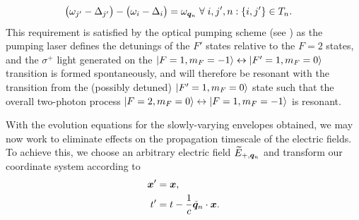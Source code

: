 \begin{align}
    \big(\omega_{j'} - \Delta_{j'}\big) - \big(\omega_i - \Delta_i\big) &= \omega_{\bm{q}_n} \;\forall \; i, j', n : \left\{i, j'\right\} \in T_n.
\end{align}
This requirement is satisfied by the optical pumping scheme (see ) as the pumping laser defines the detunings of the $F'$ states relative to the $F=2$ states, and the $\sigma^+$ light generated on the ${\left|F=1, m_F=-1\right>} \leftrightarrow {\ensuremath{\left|F'=1, m_F=0\right>}}$ transition is formed spontaneously, and will therefore be resonant with the transition from the (possibly detuned) ${\left|F'=1, m_F=0\right>}$ state such that the overall two-photon process ${\left|F=2, m_F=0\right>} \leftrightarrow {\ensuremath{\left|F=1, m_F=-1\right>}}$ is resonant.

With the evolution equations for the slowly-varying envelopes obtained, we may now work to eliminate effects on the propagation timescale of the electric fields.  To achieve this, we choose an arbitrary electric field $\widetilde{E}_{+, \bm{q}_n}$  and transform our coordinate system according to
\begin{align}
  \bm{x}' &= \bm{x}, \\
  t' &= t - \frac{1}{c} \check{\bm{q}}_n \cdot \bm{x}.
\end{align}

